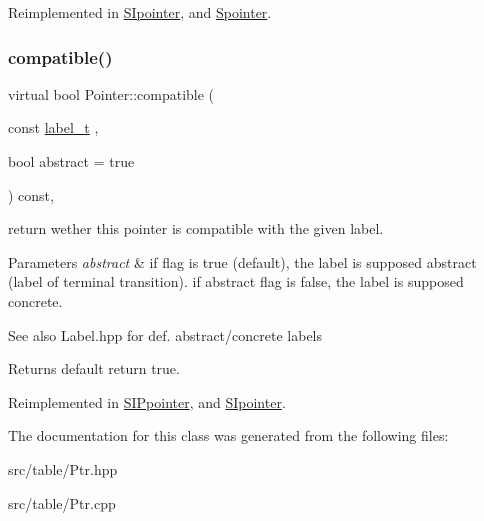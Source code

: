 Reimplemented in \mbox{\hyperlink{group__table_gac83e0619c17ce4efd589f73513706a6b}{S\+Ipointer}}, and \mbox{\hyperlink{group__table_ga54817fbae1688dab4dfff5724e762640}{Spointer}}.

\mbox{\label{classPointer_a7b636072b492b57efe3ead47e03a67bd}} 
\subsubsection{\texorpdfstring{compatible()}{compatible()}}
{\footnotesize\ttfamily virtual bool Pointer\+::compatible (\begin{DoxyParamCaption}\item[{const \mbox{\hyperlink{group__output_ga22fde970e635fcf63962743b2d5c441d}{label\+\_\+t}}}]{,  }\item[{bool}]{abstract = {\ttfamily true} }\end{DoxyParamCaption}) const\hspace{0.3cm}{\ttfamily [inline]}, {\ttfamily [virtual]}}



return wether this pointer is compatible with the given label. 


\begin{DoxyParams}{Parameters}
{\em abstract} & if flag is true (default), the label is supposed abstract (label of terminal transition). if abstract flag is false, the label is supposed concrete. \\
\hline
\end{DoxyParams}
\begin{DoxySeeAlso}{See also}
Label.\+hpp for def. abstract/concrete labels 
\end{DoxySeeAlso}
\begin{DoxyReturn}{Returns}
default return true. 
\end{DoxyReturn}


Reimplemented in \mbox{\hyperlink{group__table_gabf87df773f8e0f628e0bae79e88097db}{S\+I\+Ppointer}}, and \mbox{\hyperlink{group__table_gaca7d3c4d141ecf2874a5e5512e0c02ff}{S\+Ipointer}}.



The documentation for this class was generated from the following files\+:\begin{DoxyCompactItemize}
\item 
src/table/Ptr.\+hpp\item 
src/table/Ptr.\+cpp\end{DoxyCompactItemize}
